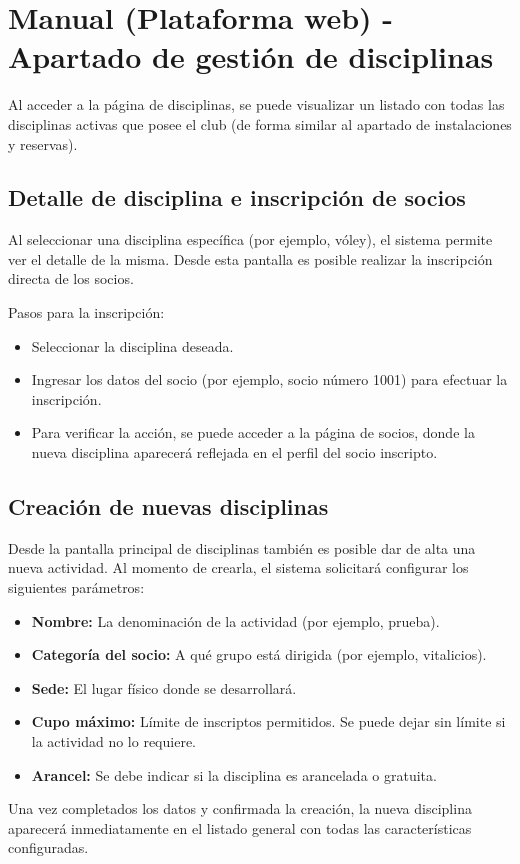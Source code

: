 \section{Manual (Plataforma web) - Apartado de gestión de disciplinas}

Al acceder a la página de disciplinas, se puede visualizar un listado con todas las disciplinas activas que posee el club (de forma similar al apartado de instalaciones y reservas).

\subsection{Detalle de disciplina e inscripción de socios}
Al seleccionar una disciplina específica (por ejemplo, vóley), el sistema permite ver el detalle de la misma. Desde esta pantalla es posible realizar la inscripción directa de los socios.

Pasos para la inscripción:
\begin{itemize}
    \item Seleccionar la disciplina deseada.
    \item Ingresar los datos del socio (por ejemplo, socio número 1001) para efectuar la inscripción.
    \item Para verificar la acción, se puede acceder a la página de socios, donde la nueva disciplina aparecerá reflejada en el perfil del socio inscripto.
\end{itemize}

\subsection{Creación de nuevas disciplinas}
Desde la pantalla principal de disciplinas también es posible dar de alta una nueva actividad. Al momento de crearla, el sistema solicitará configurar los siguientes parámetros:

\begin{itemize}
    \item \textbf{Nombre:} La denominación de la actividad (por ejemplo, prueba).
    \item \textbf{Categoría del socio:} A qué grupo está dirigida (por ejemplo, vitalicios).
    \item \textbf{Sede:} El lugar físico donde se desarrollará.
    \item \textbf{Cupo máximo:} Límite de inscriptos permitidos. Se puede dejar sin límite si la actividad no lo requiere.
    \item \textbf{Arancel:} Se debe indicar si la disciplina es arancelada o gratuita.
\end{itemize}

Una vez completados los datos y confirmada la creación, la nueva disciplina aparecerá inmediatamente en el listado general con todas las características configuradas.
